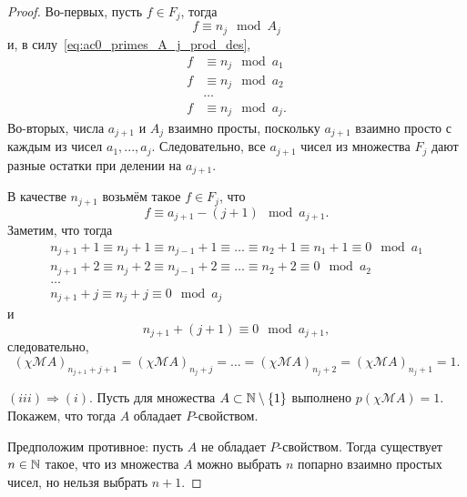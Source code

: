 \begin{proof}
	Во-первых, пусть $f \in F_{j}$,
	тогда
	\begin{equation}
		f \equiv n_j \mod A_j
	\end{equation}
	и, в силу~\eqref{eq:ac0_primes_A_j_prod_des},
	\begin{equation}
		\begin{array}{rl}
		f &\equiv n_j \mod a_1
		\\
		f &\equiv n_j \mod a_2
		\\
		&\dots
		\\
		f &\equiv n_j \mod a_j
		.
		\end{array}
	\end{equation}
	Во-вторых, числа $a_{j+1}$ и $A_j$ взаимно просты, поскольку $a_{j+1}$ взаимно просто с каждым из чисел $a_1,...,a_j$.
	Следовательно, все $a_{j+1}$ чисел из множества $F_j$ дают разные остатки при делении на $a_{j+1}$.

	В качестве $n_{j+1}$ возьмём такое $f\in F_j$, что
	\begin{equation}
		f \equiv a_{j+1} - (j+1) \mod a_{j+1}
		.
	\end{equation}
	Заметим, что тогда
	\begin{equation}
		\begin{array}{l}
			n_{j+1} + 1 \equiv n_j + 1 \equiv n_{j-1} + 1 \equiv \dots \equiv n_2 + 1 \equiv n_1 + 1 \equiv 0 \mod a_1
			\\
			n_{j+1} + 2 \equiv n_j + 2 \equiv n_{j-1} + 2 \equiv \dots \equiv n_2 + 2 \equiv 0 \mod a_2
			\\
			\dots
			\\
			n_{j+1} + j \equiv n_j + j  \equiv 0 \mod a_j
		\end{array}
	\end{equation}
	и
	\begin{equation}
		n_{j+1} + (j+1) \equiv 0 \mod a_{j+1}
		,
	\end{equation}
	следовательно,
	\begin{equation}
		(\chi\mathscr{M}A)_{n_{j+1} + j+1} = (\chi\mathscr{M}A)_{n_{j} + j} =
		\dots = (\chi\mathscr{M}A)_{n_{j} + 2} = (\chi\mathscr{M}A)_{n_{j} + 1} = 1
		.
	\end{equation}

	$(iii) \Rightarrow (i)$.
	Пусть для множества $A\subset\mathbb{N}\setminus\{1\}$ выполнено $p(\chi\mathscr{M}A)=1$.
	Покажем, что тогда $A$ обладает $P$-свойством.

	Предположим противное: пусть $A$ не обладает $P$-свойством.
	Тогда существует $n\in\mathbb{N}$ такое, что из множества $A$ можно выбрать $n$
	попарно взаимно простых чисел, но нельзя выбрать $n+1$.


\end{proof}
